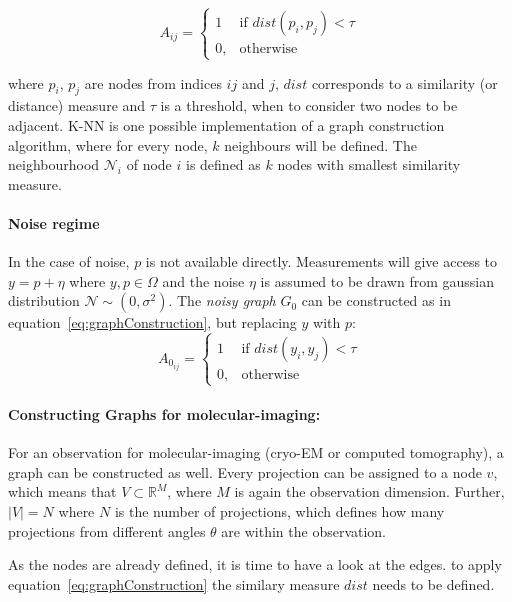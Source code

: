 \begin{equation}
    \label{eq:graphConstruction}
    A_{ij} =    
    \begin{cases}
        1  & \text{if } dist(p_i, p_j) < \tau\\
        0, & \text{otherwise}
    \end{cases}
\end{equation}

where $p_i$, $p_j$ are nodes from indices $ij$ and $j$, $dist$ corresponds to a similarity (or distance) measure and $\tau$ is a threshold, 
when to consider two nodes to be adjacent.
K-NN is one possible implementation of a graph construction algorithm, 
where for every node, $k$ neighbours will be defined.
The neighbourhood $\mathcal{N}_i$ of node $i$ is defined as $k$ nodes with smallest similarity measure.

\paragraph{Noise regime}
In the case of noise, $p$ is not available directly.
Measurements will give access to $y = p + \eta$ where $y,p \in \Omega$ and the noise $\eta$ is assumed to be drawn from gaussian distribution $\mathcal{N} \sim (0,\sigma^2)$.
The \textit{noisy graph} $G_0$ can be constructed as in equation~\ref{eq:graphConstruction}, but replacing $y$ with $p$:
\begin{equation}
    \label{eq:graphConstructionNoise}
    A_{0_{ij}} =    
    \begin{cases}
        1  & \text{if } dist(y_i, y_j) < \tau\\
        0, & \text{otherwise}
    \end{cases}
\end{equation}

\paragraph{Constructing Graphs for molecular-imaging:}
For an observation for molecular-imaging (cryo-EM or computed tomography), a graph can be constructed as well.
Every projection can be assigned to a node $v$, which means that $V \subset \mathbb{R}^M$, where 
$M$ is again the observation dimension. 
Further, $|V|=N$ where $N$ is the number of projections, which defines how many projections from different
angles $\theta$ are within the observation.

As the nodes are already defined, it is time to have a look at the edges.
to apply equation~\ref{eq:graphConstruction} the similary measure $dist$ needs to be defined.

